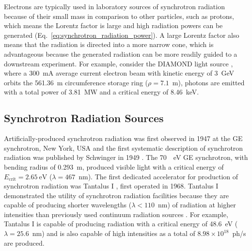 \documentclass[../main.tex]{subfiles}
\begin{document}
Electrons are typically used in laboratory sources of synchrotron radiation because of their small mass in comparison to other particles, such as protons, which means the Lorentz factor is large and high radiation powers can be generated (Eq.~\ref{eq:synchrotron_radiation_power}). A large Lorentz factor also means that the radiation is directed into a more narrow cone, which is advantageous because the generated radiation can be more readily guided to a downstream experiment. For example, consider the DIAMOND light source \cite{materlik2015diamond}, where a 300~\si{\milli\ampere} average current electron beam with kinetic energy of 3~\si{\giga\electronvolt} orbits the 561.36~\si{\meter} circumference storage ring ($\rho = 7.1$~\si{\meter}), photons are emitted with a total power of 3.81~\si{\mega\watt} and a critical energy of 8.46~\si{\kilo\electronvolt}.   

\subsection{Synchrotron Radiation Sources}

Artificially-produced synchrotron radiation was first observed in 1947 at the GE synchrotron, New York, USA \cite{elder1948radiation} and the first systematic description of synchrotron radiation was published by Schwinger in 1949 \cite{schwinger1949classical}. The 70~\si{\meg\electronvolt} GE synchrotron, with bending radius of 0.293~\si{\meter}, produced visible light with a critical energy of $E_{\mathrm{crit}} = 2.65~\si{\electronvolt}$ ($\lambda = 467$~\si{\nano\meter}). The first dedicated accelerator for production of synchrotron radiation was Tantalus I \cite{rowe1973tantalus}, first operated in 1968. Tantalus I demonstrated the utility of synchrotron radiation facilities because they are capable of producing shorter wavelengths ($\lambda < 110$~\si{\nano\meter}) of radiation at higher intensities than previously used continuum radiation sources \cite{rowe1973tantalus}. For example, Tantalus I is capable of producing radiation with a critical energy of 48.6~\si{\electronvolt} ($\lambda = 25.6$~\si{\nano\meter}) and is also capable of high intensities as a total of $8.98\times 10^{18}$~ph/\si{\second} are produced.  
\end{document}
